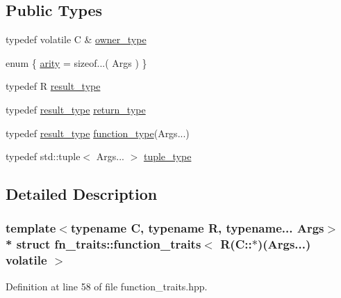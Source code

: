 \subsection*{Public Types}
\begin{DoxyCompactItemize}
\item 
typedef volatile C \& \hyperlink{structfn__traits_1_1function__traits_3_01_r_07_c_1_1_5_08_07_args_8_8_8_08_01volatile_01_4_a6dd56bc0e49730063f88ae55fd055a84}{owner\+\_\+type}
\item 
enum \{ \hyperlink{structfn__traits_1_1function__traits_3_01_r_07_args_8_8_8_08_4_aafde9521d9646c97b984646d8273dd3ba2f612b5524050ab8d6ab3d54d52dbbb0}{arity} = sizeof...( Args )
 \}
\item 
typedef R \hyperlink{structfn__traits_1_1function__traits_3_01_r_07_args_8_8_8_08_4_a1b509243ed1b4707465625de10e6c6bb}{result\+\_\+type}
\item 
typedef \hyperlink{structfn__traits_1_1function__traits_3_01_r_07_args_8_8_8_08_4_a1b509243ed1b4707465625de10e6c6bb}{result\+\_\+type} \hyperlink{structfn__traits_1_1function__traits_3_01_r_07_args_8_8_8_08_4_adf6a35a9b703dfb4778e59f132e00a9b}{return\+\_\+type}
\item 
typedef \hyperlink{structfn__traits_1_1function__traits_3_01_r_07_args_8_8_8_08_4_a1b509243ed1b4707465625de10e6c6bb}{result\+\_\+type} \hyperlink{structfn__traits_1_1function__traits_3_01_r_07_args_8_8_8_08_4_a85e5883a1c8050fe442c1072386b2d11}{function\+\_\+type}(Args...)
\item 
typedef std\+::tuple$<$ Args... $>$ \hyperlink{structfn__traits_1_1function__traits_3_01_r_07_args_8_8_8_08_4_a9b60ae8c79e52addf352e4ae7c8077b4}{tuple\+\_\+type}
\end{DoxyCompactItemize}


\subsection{Detailed Description}
\subsubsection*{template$<$typename C, typename R, typename... Args$>$\\*
struct fn\+\_\+traits\+::function\+\_\+traits$<$ R(\+C\+::$\ast$)(\+Args...) volatile $>$}



Definition at line 58 of file function\+\_\+traits.\+hpp.



